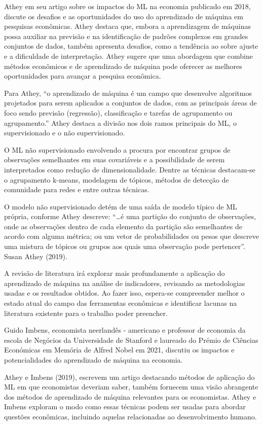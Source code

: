 \documentclass[
]{article}
\begin{document}
Athey em seu artigo sobre os impactos do ML na economia publicado em
2018, discute os desafios e as oportunidades do uso do aprendizado de
máquina em pesquisas econômicas. Athey destaca que, embora a
aprendizagem de máquinas possa auxiliar na previsão e na identificação
de padrões complexos em grandes conjuntos de dados, também apresenta
desafios, como a tendência ao sobre ajuste e a dificuldade de
interpretação. Athey sugere que uma abordagem que combine métodos
econômicos e de aprendizado de máquina pode oferecer as melhores
oportunidades para avançar a pesquisa econômica.

Para Athey, ``o aprendizado de máquina é um campo que desenvolve
algoritmos projetados para serem aplicados a conjuntos de dados, com as
principais áreas de foco sendo previsão (regressão), classificação e
tarefas de agrupamento ou agrupamento.'' Athey destaca a divisão nos
dois ramos principais do ML, o supervisionado e o não supervisionado.

O ML não supervisionado envolvendo a procura por encontrar grupos de
observações semelhantes em suas covariáveis e a possibilidade de serem
interpretados como redução de dimensionalidade. Dentre as técnicas
destacam-se o agrupamento k-means, modelagem de tópicos, métodos de
detecção de comunidade para redes e entre outras técnicas.

O modelo não supervisionado detém de uma saída de modelo típico de ML
própria, conforme Athey descreve: ``\ldots é uma partição do conjunto de
observações, onde as observações dentro de cada elemento da partição são
semelhantes de acordo com alguma métrica; ou um vetor de probabilidades
ou pesos que descreve uma mistura de tópicos ou grupos aos quais uma
observação pode pertencer''. Susan Athey (2019).

A revisão de literatura irá explorar mais profundamente a aplicação do
aprendizado de máquina na análise de indicadores, revisando as
metodologias usadas e os resultados obtidos. Ao fazer isso, espera-se
compreender melhor o estado atual do campo das ferramentas econômicas e
identificar lacunas na literatura existente para o trabalho poder
preencher.

Guido Imbens, economista neerlandês - americano e professor de economia
da escola de Negócios da Universidade de Stanford e laureado do Prémio
de Ciências Económicas em Memória de Alfred Nobel em 2021, discutiu os
impactos e potencialidades do aprendizado de máquina na economia.

Athey e Imbens (2019), escrevem um artigo destacando métodos de
aplicação do ML em que economistas deveriam saber, também fornecem uma
visão abrangente dos métodos de aprendizado de máquina relevantes para
os economistas. Athey e Imbens exploram o modo como essas técnicas podem
ser usadas para abordar questões econômicas, incluindo aquelas
relacionadas ao desenvolvimento humano.
\end{document}
